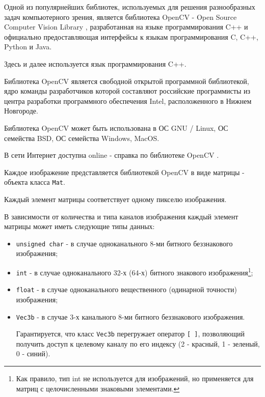 

Одной из популярнейших библиотек, используемых для решения разнообразных задач компьютерного зрения, является библиотека OpenCV - Open Source Computer Vision Library \cite{opencv}, разработанная на языке программирования C++ и официально предоставляющая интерфейсы к языкам программирования C, C++, Python и Java.

Здесь и далее используется язык программирования C++.

Библиотека OpenCV является свободной открытой программной библиотекой, ядро команды разработчиков которой составляют российские программисты из центра разработки программного обеспечения Intel, расположенного в Нижнем Новгороде.

Библиотека OpenCV может быть использована в ОС GNU / Linux, ОС семейства BSD, ОС семейства Windows, MacOS.

В сети Интернет доступна online - справка по библиотеке OpenCV \cite{opencv-help}.


Каждое изображение представляется библиотекой OpenCV в виде матрицы - объекта класса \verb|Mat|.

Каждый элемент матрицы соответствует одному пикселю изображения.

В зависимости от количества и типа каналов изображения каждый элемент матрицы может иметь следующие типы данных:

\begin{itemize}

	\item \verb|unsigned char| - в случае одноканального 8-ми битного беззнакового изображения;
	\item \verb|int| - в случае одноканального 32-х (64-х) битного знакового изображения\footnote{Как правило, тип int не используется для изображений, но применяется для матриц с целочисленными знаковыми элементами.};
	\item \verb|float| - в случае одноканального вещественного (одинарной точности) изображения;
	\item \verb|Vec3b| - в случае 3-х канального 8-ми битного беззнакового изображения.

	Гарантируется, что класс \verb|Vec3b| перегружает оператор \verb|[ ]|, позволяющий получить доступ к целевому каналу по его индексу (2 - красный, 1 - зеленый, 0 - синий).

\end{itemize}

